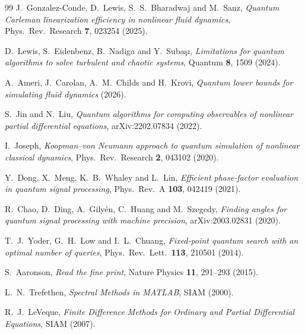 \documentclass[11pt,a4paper]{article}
\theoremstyle{plain}
\theoremstyle{definition}
\theoremstyle{remark}
\begin{document}
\begin{thebibliography}{99}
J.~Gonzalez-Conde, D.~Lewis, S.~S.~Bharadwaj and M.~Sanz,
\emph{Quantum Carleman linearization efficiency in nonlinear fluid dynamics},
Phys.\ Rev.\ Research \textbf{7}, 023254 (2025).

D.~Lewis, S.~Eidenbenz, B.~Nadiga and Y.~Suba\c{s}\i,
\emph{Limitations for quantum algorithms to solve turbulent and chaotic systems},
Quantum \textbf{8}, 1509 (2024).

A.~Ameri, J.~Carolan, A.~M.~Childs and H.~Krovi,
\emph{Quantum lower bounds for simulating fluid dynamics} (2026).

S.~Jin and N.~Liu,
\emph{Quantum algorithms for computing observables of nonlinear partial
differential equations},
arXiv:2202.07834 (2022).

I.~Joseph,
\emph{Koopman--von Neumann approach to quantum simulation of nonlinear classical
dynamics},
Phys.\ Rev.\ Research \textbf{2}, 043102 (2020).

Y.~Dong, X.~Meng, K.~B.~Whaley and L.~Lin,
\emph{Efficient phase-factor evaluation in quantum signal processing},
Phys.\ Rev.\ A \textbf{103}, 042419 (2021).

R.~Chao, D.~Ding, A.~Gily\'en, C.~Huang and M.~Szegedy,
\emph{Finding angles for quantum signal processing with machine precision},
arXiv:2003.02831 (2020).

T.~J.~Yoder, G.~H.~Low and I.~L.~Chuang,
\emph{Fixed-point quantum search with an optimal number of queries},
Phys.\ Rev.\ Lett.\ \textbf{113}, 210501 (2014).

S.~Aaronson,
\emph{Read the fine print},
Nature Physics \textbf{11}, 291--293 (2015).

L.~N.~Trefethen,
\emph{Spectral Methods in MATLAB},
SIAM (2000).

R.~J.~LeVeque,
\emph{Finite Difference Methods for Ordinary and Partial Differential Equations},
SIAM (2007).

\end{thebibliography}
\end{document}
